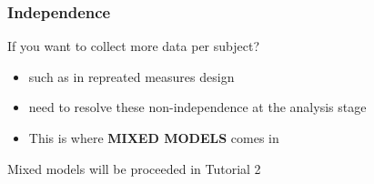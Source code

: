 \documentclass[10p]{beamer}\usepackage[]{graphicx}\usepackage[]{color}
\begin{document}
\begin{frame}
\frametitle{Independence}
If you want to collect more data per subject?
\begin{itemize}
\item such as in repreated measures design
\item need to resolve these non-independence at the analysis stage
\item This is where \textbf{MIXED MODELS} comes in
\end{itemize}
\pause
\begin{center}
\huge
Mixed models will be proceeded in Tutorial 2
\end{center}
\end{frame}
\end{document}
